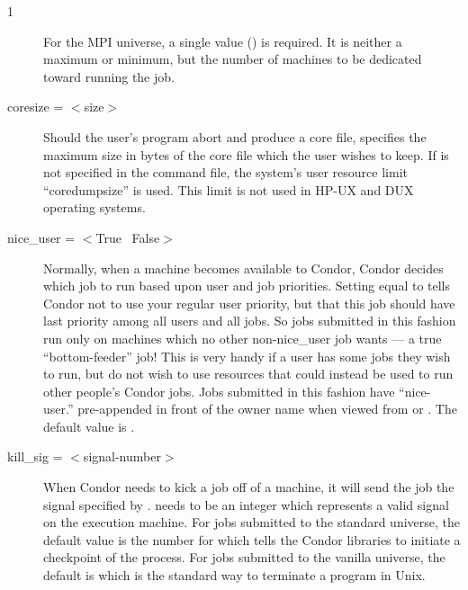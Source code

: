 \begin{ManPage}{\label{man-condor-submit}}{1}
\begin{description}
For the MPI universe, a single value () is required.
It is neither a maximum or minimum, but 
the number of machines to be dedicated toward running the job.


\item[coresize = $<$size$>$] Should the user's program abort and produce
a core file,  specifies the maximum size in bytes of the
core file which the user wishes to keep. If  is not
specified in the command file, the system's user resource limit
\mbox{``coredumpsize''} is used.
This limit is not used in HP-UX and DUX operating systems. 


\item[nice\_user = $<$True \Bar\ False$>$] \label{man-condor-submit-nice}Normally, when a machine
becomes available to Condor, Condor decides which job to run based upon
user and job priorities. Setting  equal to 
tells Condor not to use your regular user priority, but that this job
should have last priority among all users and all jobs. So jobs
submitted in this fashion run only on machines which no other
non-nice\_user job wants --- a true ``bottom-feeder'' job! This is very
handy if a user has some jobs they wish to run, but do not wish to use
resources that could instead be used to run other people's Condor jobs. Jobs
submitted in this fashion have ``nice-user.'' pre-appended in front of
the owner name when viewed from  or .  The
default value is .



\item[kill\_sig = $<$signal-number$>$] When Condor needs to kick a job
off of a machine, it will send the job the signal specified by
.   needs to be an integer which
represents a valid signal on the execution machine.  For jobs submitted
to the standard universe, the default value is the number for
\verb@SIGTSTP@ which tells the Condor libraries to initiate a checkpoint
of the process.  For jobs submitted to the vanilla universe,
the default 
is \verb@SIGTERM@ which is the standard way to terminate a program in Unix.  



\end{description}
\end{ManPage}
